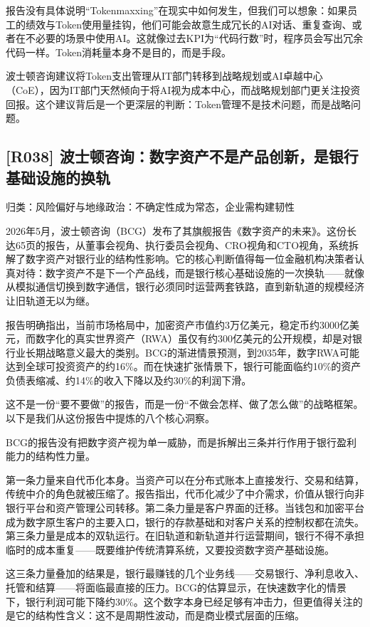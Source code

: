 \documentclass[11pt]{ctexart}
\begin{document}
报告没有具体说明“Tokenmaxxing”在现实中如何发生，但我们可以想象：如果员工的绩效与Token使用量挂钩，他们可能会故意生成冗长的AI对话、重复查询、或者在不必要的场景中使用AI。这就像过去KPI为“代码行数”时，程序员会写出冗余代码一样。Token消耗量本身不是目的，而是手段。

波士顿咨询建议将Token支出管理从IT部门转移到战略规划或AI卓越中心（CoE），因为IT部门天然倾向于将AI视为成本中心，而战略规划部门更关注投资回报。这个建议背后是一个更深层的判断：Token管理不是技术问题，而是战略问题。

\subsection{[R038] 波士顿咨询：数字资产不是产品创新，是银行基础设施的换轨}
{\small\color{refgray}归类：风险偏好与地缘政治：不确定性成为常态，企业需构建韧性}

2026年5月，波士顿咨询（BCG）发布了其旗舰报告《数字资产的未来》。这份长达65页的报告，从董事会视角、执行委员会视角、CRO视角和CTO视角，系统拆解了数字资产对银行业的结构性影响。它的核心判断值得每一位金融机构决策者认真对待：数字资产不是下一个产品线，而是银行核心基础设施的一次换轨——就像从模拟通信切换到数字通信，银行必须同时运营两套铁路，直到新轨道的规模经济让旧轨道无以为继。

报告明确指出，当前市场格局中，加密资产市值约3万亿美元，稳定币约3000亿美元，而数字化的真实世界资产（RWA）虽仅有约300亿美元的公开规模，却是对银行业长期战略意义最大的类别。BCG的渐进情景预测，到2035年，数字RWA可能达到全球可投资资产的约16\%。而在快速扩张情景下，银行可能面临约10\%的资产负债表缩减、约14\%的收入下降以及约30\%的利润下滑。

这不是一份“要不要做”的报告，而是一份“不做会怎样、做了怎么做”的战略框架。以下是我们从这份报告中提炼的八个核心洞察。

BCG的报告没有把数字资产视为单一威胁，而是拆解出三条并行作用于银行盈利能力的结构性力量。

第一条力量来自代币化本身。当资产可以在分布式账本上直接发行、交易和结算，传统中介的角色就被压缩了。报告指出，代币化减少了中介需求，价值从银行向非银行平台和资产管理公司转移。第二条力量是客户界面的迁移。当钱包和加密平台成为数字原生客户的主要入口，银行的存款基础和对客户关系的控制权都在流失。第三条力量是成本的双轨运行。在旧轨道和新轨道并行运营期间，银行不得不承担临时的成本重复——既要维护传统清算系统，又要投资数字资产基础设施。

这三条力量叠加的结果是，银行最赚钱的几个业务线——交易银行、净利息收入、托管和结算——将面临最直接的压力。BCG的估算显示，在快速数字化的情景下，银行利润可能下降约30\%。这个数字本身已经足够有冲击力，但更值得关注的是它的结构性含义：这不是周期性波动，而是商业模式层面的压缩。
\end{document}
